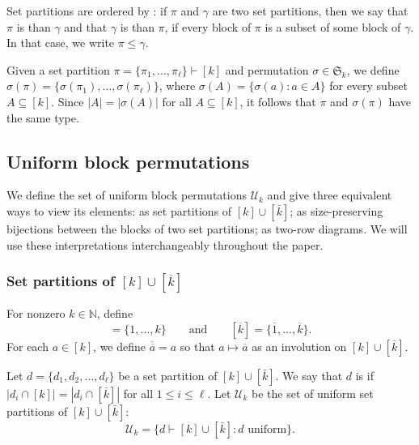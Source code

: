 Set partitions are ordered by : if $\pi$ and $\gamma$ are two set partitions, then we say that $\pi$ is 
than $\gamma$ and that $\gamma$ is  than $\pi$, if every block of $\pi$ is a subset of some block of $\gamma$. In that case,
we write $\pi\leqslant \gamma$.

Given a set partition $\pi = \{\pi_1, \ldots, \pi_\ell\} \vdash [k]$
and permutation $\sigma \in \mathfrak{S}_k$, we define
$\sigma(\pi) = \{\sigma(\pi_1), \ldots, \sigma(\pi_\ell)\}$,
where $\sigma(A) = \{\sigma(a) : a\in A\}$ for every subset $A \subseteq [k]$.
Since $|A| = |\sigma(A)|$ for all $A \subseteq [k]$, it follows that
$\pi$ and $\sigma(\pi)$ have the same type.

\subsection{Uniform block permutations}
\label{section.UBP}

We define the set of uniform block permutations $\mathcal{U}_k$ and give
three equivalent ways to view its elements:
as set partitions of $[k]\cup [\bar{k}]$;
as size-preserving bijections between the blocks of two set partitions;
as two-row diagrams.
We will use these interpretations interchangeably throughout the paper.

\subsubsection{Set partitions of $[k] \cup [\overline{k}]$}
For nonzero $k\in \mathbb{N}$, define
\begin{equation*}
    [k]= \{1, \dots, k\}
    \qquad\text{and}\qquad
    [\overline{k}] = \{\overline{1}, \ldots, \overline{k}\}.
\end{equation*}
For each $a \in [k]$, we define $\overline{\overline{a}} = a$ so that
$a \mapsto \overline{a}$ as an involution on $[k] \cup [\overline{k}]$.

Let $d = \{d_1, d_2, \ldots, d_\ell\}$ be a set partition of $[k]\cup [\bar{k}]$.
We say that $d$ is  if
$|d_i\cap [k]|= |d_i\cap [\bar{k}]|$ for all $1\leqslant i\leqslant \ell$.
Let $\mathcal{U}_k$ be the set of uniform set partitions of $[k] \cup [\bar{k}]$:
\[
    \mathcal{U}_k = \big\{ d \vdash [k]\cup[\bar{k}]: \text{$d$ uniform}\big\}.
\]

